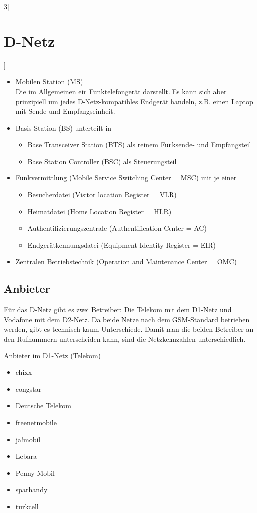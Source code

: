 \begin{multicols}{3}[\section {D-Netz}]
\begin{itemize}
	\item Mobilen Station (MS) \\
	Die im Allgemeinen ein Funktelefongerät darstellt. Es kann sich aber prinzipiell um jedes D-Netz-kompatibles Endgerät handeln, 		 	z.B. einen Laptop mit Sende und Empfangseinheit.
	\item Basis Station (BS)
	unterteilt in
		\begin{itemize}
			\item Base Transceiver Station (BTS)
			als reinem Funksende- und Empfangsteil
			\item Base Station Controller (BSC)
			als Steuerungsteil
		\end{itemize}
	\item Funkvermittlung (Mobile Service Switching Center = MSC) mit je einer 
		\begin{itemize}
			\item Besucherdatei (Visitor location Register = VLR)
			\item Heimatdatei (Home Location Register = HLR)
			\item Authentifizierungszentrale (Authentification Center = AC)
			\item Endgerätkennungsdatei (Equipment Identity Register = EIR)
		\end{itemize}
	\item Zentralen Betriebstechnik (Operation and Maintenance Center = OMC)
\end{itemize}






\subsection*{Anbieter}

Für das D-Netz gibt es zwei Betreiber: Die Telekom mit dem D1-Netz und Vodafone mit dem D2-Netz. Da beide Netze nach dem GSM-Standard betrieben werden, gibt es technisch kaum Unterschiede. Damit man die beiden Betreiber an den Rufnummern unterscheiden kann, sind die Netzkennzahlen unterschiedlich.

Anbieter im D1-Netz  (Telekom)

\begin{itemize}
\item chixx
\item congstar
\item Deutsche Telekom
\item freenetmobile
\item ja!mobil
\item Lebara
\item Penny Mobil
\item sparhandy
\item turkcell
\end{itemize}


\end{multicols}
